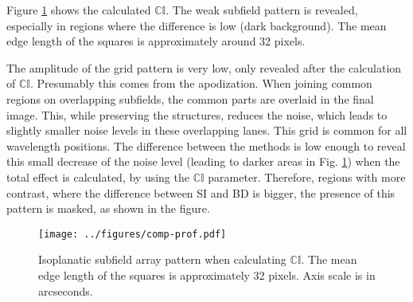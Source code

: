 Figure \ref{com:prof} shows the calculated $\mathbb{CI}$. The weak subfield pattern is revealed, especially in regions where the difference is low (dark background). The mean edge length of the squares is approximately around 32 pixels. 

The amplitude of the grid pattern is very low, only revealed after the calculation of $\mathbb{CI}$. Presumably this comes from the apodization. When joining common regions on overlapping subfields, the common parts are overlaid in the final image. This, while preserving the structures, reduces the noise, which leads to slightly smaller noise levels in these overlapping lanes. This grid is common for all wavelength positions. The difference between the methods is low enough to reveal this small decrease of the noise level (leading to darker areas in Fig. \ref{com:prof}) when the total effect is calculated, by using the $\mathbb{CI}$ parameter. Therefore, regions with more contrast, where the difference between SI and BD is bigger, the presence of this pattern is masked, as shown in the figure. 
\begin{figure}[]
\begin{center}
\texttt{[image: ../figures/comp-prof.pdf]}
\caption{Isoplanatic subfield array pattern when calculating $\mathbb{CI}$. The mean edge length of the squares is approximately 32 pixels. Axis scale is in arcseconds.}
\label{com:prof}
\end{center}
\end{figure} 

